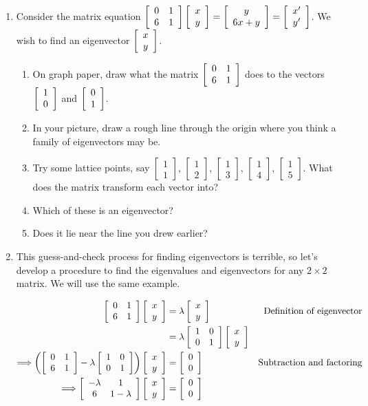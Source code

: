 \documentclass[../textbook.tex]{subfiles}
\begin{document}
\begin{enumerate}
\item Consider the matrix equation $\left[\begin{array}{cc} 0 & 1 \\ 6 & 1 \end{array}\right]\left[\begin{array}{c} x \\ y \end{array}\right] = \left[\begin{array}{c} y \\ 6x+y \end{array}\right]=\left[\begin{array}{c} x' \\ y' \end{array}\right]$. We wish to find an eigenvector $\left[\begin{array}{c} x \\ y \end{array}\right]$.
\begin{enumerate}
\item On graph paper, draw what the matrix $\left[\begin{array}{cc} 0 & 1 \\ 6 & 1 \end{array}\right]$ does to the vectors $\left[\begin{array}{c} 1 \\ 0 \end{array}\right]$ and $\left[\begin{array}{c} 0 \\ 1 \end{array}\right]$.
\item In your picture, draw a rough line through the origin where you think a family of eigenvectors may be.
\item Try some lattice points, say $\left[\begin{array}{c} 1 \\ 1 \end{array}\right]$, $\left[\begin{array}{c} 1 \\ 2 \end{array}\right]$, $\left[\begin{array}{c} 1 \\ 3 \end{array}\right]$, $\left[\begin{array}{c} 1 \\ 4 \end{array}\right]$, $\left[\begin{array}{c} 1 \\ 5 \end{array}\right]$. What does the matrix transform each vector into?
\item Which of these is an eigenvector?
\item Does it lie near the line you drew earlier?
\end{enumerate}
\item This guess-and-check process for finding eigenvectors is terrible, so let's develop a procedure to find the eigenvalues and eigenvectors for any $2\times 2$ matrix. We will use the same example.

\begin{align*}
\left[\begin{array}{cc} 0 & 1 \\ 6 & 1 \end{array}\right]\left[\begin{array}{c} x \\ y \end{array}\right] &= \lambda\left[\begin{array}{c} x \\ y \end{array}\right] & \text{Definition of eigenvector} \\
&= \lambda\left[\begin{array}{cc} 1 & 0 \\ 0 & 1 \end{array}\right]\left[\begin{array}{c} x \\ y \end{array}\right] \\
\Longrightarrow \left(\left[\begin{array}{cc} 0 & 1 \\ 6 & 1 \end{array}\right]-\lambda\left[\begin{array}{cc} 1 & 0 \\ 0 & 1 \end{array}\right]\right)\left[\begin{array}{c} x \\ y \end{array}\right]&=\left[\begin{array}{c} 0 \\ 0 \end{array}\right] & \text{Subtraction and factoring} \\
\Longrightarrow \left[\begin{array}{cc} -\lambda & 1 \\ 6 & 1-\lambda \end{array}\right]\left[\begin{array}{c} x \\ y \end{array}\right] &= \left[\begin{array}{c} 0 \\ 0 \end{array}\right]
\end{align*}


\end{enumerate}
\end{document}

